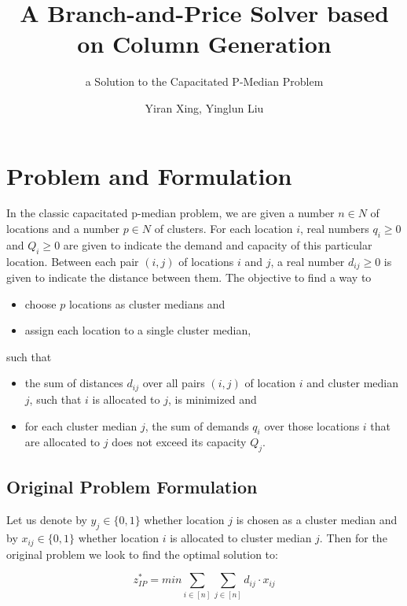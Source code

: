 \documentclass[
	11pt,
	DIV10,
	ngerman,
	a4paper,
	oneside,
	headings=normal,
	captions=tableheading,
	final,
	numbers=noenddot
]{scrartcl}
\title{A Branch-and-Price Solver based on Column Generation}
\subtitle{\vspace{0.5cm}a Solution to the Capacitated P-Median Problem}
\author{Yiran Xing, Yinglun Liu}
\begin{document}
\maketitle


\section{Problem and Formulation}
\label{sec1}

In the classic capacitated p-median problem, we are given a number $ n \in N $ of locations and a number $ p \in N $ of clusters. For each location $ i $, real numbers $ q_{i} \geq 0 $ and $ Q_{i} \geq 0 $ are given to indicate the demand and capacity of this particular location. Between each pair $ \left(i, j\right) $ of locations $ i $ and $ j $, a real number $ d_{ij} \geq 0 $ is given to indicate the distance between them. The objective to find a way to

\begin{itemize}
	\item choose $ p $ locations as cluster medians and
	\item assign each location to a single cluster median,
\end{itemize}

such that

\begin{itemize}
    \item the sum of distances $ d_{ij} $ over all pairs $ \left(i, j\right) $ of location $ i $ and cluster median $ j $, such that $ i $ is allocated to $ j $, is minimized and
    \item for each cluster median $ j $, the sum of demands $ q_{i} $ over those locations $ i $ that are allocated to $ j $ does not exceed its capacity $ Q_{j} $.
\end{itemize}

\subsection{Original Problem Formulation}

Let us denote by $ y_{j} \in \{0, 1\} $ whether location $ j $ is chosen as a cluster median and by $ x_{ij} \in \{0, 1\} $ whether location $ i $ is allocated to cluster median $ j $. Then for the original problem we look to find the optimal solution to:

\begin{equation}
	\label{eq1}
	z_{IP}^{*} = min \sum_{i \in [n]} \sum_{j \in [n]} d_{ij} \cdot x_{ij}
\end{equation}
\end{document}
